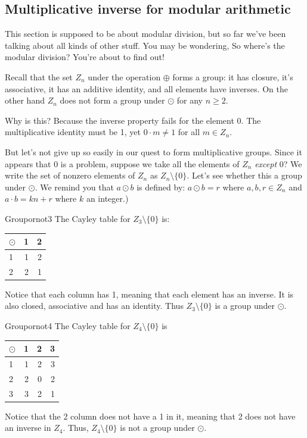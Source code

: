 \subsection{Multiplicative inverse for modular arithmetic\label{subsec:MultInve}}
This section is supposed to be about modular division, but so far we've been talking about all kinds of other stuff. You may be wondering, So where's the modular division? You're about to find out!

Recall that the set $Z_n$ under the operation $\oplus$ forms a group:  
it has closure, it's associative, it has an additive identity, and all elements have inverses.  On the other hand $Z_n$ does not form a group under $\odot$ for any $n \ge 2$.  


Why is this? Because the inverse property fails for the element 0. The multiplicative identity must be 1, yet $0\cdot m \neq 1$ for all $m\in Z_n$.

But let's not give up so easily in our quest to form multiplicative groups. Since it appears that 0 is a problem, suppose we take all the elements of $Z_n$ \emph{except} 0? We write the set of nonzero elements of $Z_n$ as $Z_n \setminus \{0\} $. Let's see whether this a group under $\odot$. We remind you that $a \odot b$  is defined by: $a \odot b = r$ where $a,b,r\in Z_n$ and $a \cdot b = kn + r$ where $k$ an integer.)


\begin{example}{Groupornot3}
The Cayley table for $Z_3 \setminus \{0\}$ is:


\begin{tabular}{ l | r r  }
  $\odot$ & 1 & 2 \\
  \hline
  1 & 1 & 2 \\
  2 & 2 & 1 \\
\end{tabular}


Notice that each column has 1, meaning that each element has an inverse.  It is also closed, associative and has an identity. Thus $Z_3 \setminus \{0\}$ is a group under $\odot$.  
\end{example}


\begin{example}{Groupornot4}
The Cayley table for $Z_4 \setminus \{0\}$ is


\begin{tabular}{ l | r r r }
  $\odot$ & 1 & 2 & 3\\
  \hline
  1 & 1 & 2 & 3\\
  2 & 2 & 0 & 2\\
  3 & 3 & 2 & 1\\
\end{tabular}

Notice that the 2 column does not have a 1 in it, meaning that 2 does not have an inverse in $Z_4$. Thus, $Z_4 \setminus \{0\}$ is not a group under $\odot$.
\end{example}

